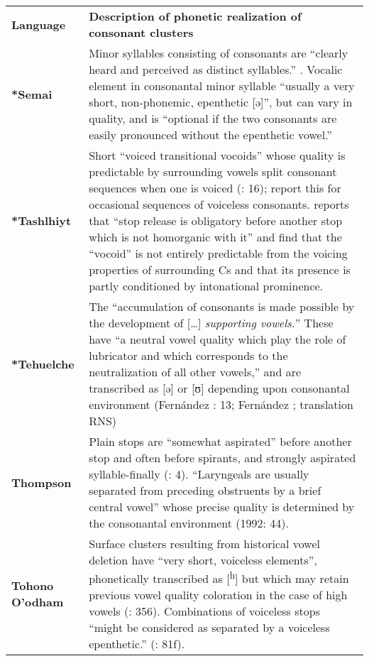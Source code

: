 \begin{table}
\begin{tabularx}{\textwidth}{XX}
\lsptoprule

\textbf{Language} & \textbf{Description of phonetic realization of consonant clusters}\\
\textbf{*Semai} & Minor syllables consisting of consonants are “clearly heard and perceived as distinct syllables.” \citep[321]{Sloan1988}. Vocalic element in consonantal minor syllable “usually a very short, non-phonemic, epenthetic [ə]”, but can vary in quality, and is “optional if the two consonants are easily pronounced without the epenthetic vowel.” \citep[2]{Philips2007}\\
\textbf{*Tashlhiyt} & Short “voiced transitional vocoids” whose quality is predictable by surrounding vowels split consonant sequences when one is voiced (\citealt{DellElmedlaoui2002}: 16); \citet[16]{GordonNafi2012} report this for occasional sequences of voiceless consonants. \citet[210]{Ridouane2008} reports that “stop release is obligatory before another stop which is not homorganic with it” and \citet{GriceEtAl2015} find that the “vocoid” is not entirely predictable from the voicing properties of surrounding Cs and that its presence is partly conditioned by intonational prominence.\\
\textbf{*Tehuelche} & The “accumulation of consonants is made possible by the development of […] \textit{supporting vowels.}” These have “a neutral vowel quality which play the role of lubricator and which corresponds to the neutralization of all other vowels,” and are transcribed as [ə] or [ʊ] depending upon consonantal environment (Fernández \citealt{GarayHernández2006}: 13; Fernández \citealt{Garay1998}; translation RNS)\\
\textbf{Thompson} & Plain stops are “somewhat aspirated” before another stop and often before spirants, and strongly aspirated syllable-finally (\citealt{ThompsonThompson1992}: 4). “Laryngeals are usually separated from preceding obstruents by a brief central vowel” whose precise quality is determined by the consonantal environment (1992: 44).\\
\textbf{Tohono O’odham} & Surface clusters resulting from historical vowel deletion have “very short, voiceless elements”, phonetically transcribed as [\textsuperscript{h}] but which may retain previous vowel quality coloration in the case of high vowels (\citealt{HillZepeda1992}: 356). Combinations of voiceless stops “might be considered as separated by a voiceless epenthetic.” (\citealt{Mason1950}: 81f).\\

\end{tabularx}
\end{table}
